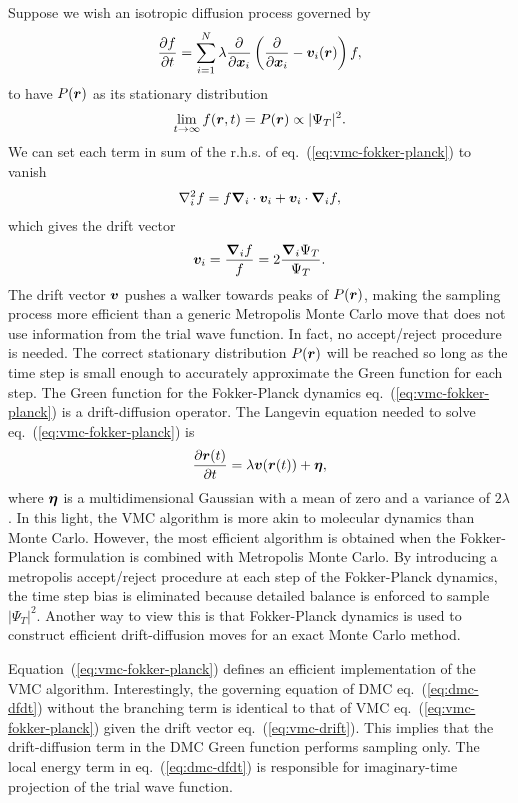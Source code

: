 Suppose we wish an isotropic diffusion process governed by
\begin{align} \label{eq:vmc-fokker-planck}
\dfrac{\partial f}{\partial t} = \sum\limits_{i=1}^N \lambda\dfrac{\partial}{\partial\boldsymbol{x}_i}\left(
\dfrac{\partial}{\partial\boldsymbol{x}_i} -\boldsymbol{v}_i(\boldsymbol{r})
\right)f,
\end{align}
to have $P(\boldsymbol{r})$ as its stationary distribution
\begin{align}
\lim\limits_{t\rightarrow\infty} f(\boldsymbol{r},t) = P(\boldsymbol{r}) \propto \vert\Psi_T\vert^2.
\end{align}
We can set each term in sum of the r.h.s. of eq.~(\ref{eq:vmc-fokker-planck}) to vanish
\begin{align}
\nabla_i^2 f = f\boldsymbol{\nabla}_i\cdot\boldsymbol{v}_i + \boldsymbol{v}_i\cdot\boldsymbol{\nabla}_if,
\end{align}
which gives the drift vector
\begin{align} \label{eq:vmc-drift}
\boldsymbol{v}_i = \dfrac{\boldsymbol{\nabla}_if}{f} = 2\dfrac{\boldsymbol{\nabla}_i\Psi_T}{\Psi_T}.
\end{align}
The drift vector $\boldsymbol{v}$ pushes a walker towards peaks of $P(\boldsymbol{r})$, making the sampling process more efficient than a generic Metropolis Monte Carlo move that does not use information from the trial wave function.
In fact, no accept/reject procedure is needed.
The correct stationary distribution $P(\boldsymbol{r})$ will be reached so long as the time step is small enough to accurately approximate the Green function for each step.
The Green function for the Fokker-Planck dynamics eq.~(\ref{eq:vmc-fokker-planck}) is a drift-diffusion operator. The Langevin equation needed to solve eq.~(\ref{eq:vmc-fokker-planck}) is
\begin{align}
\dfrac{\partial\boldsymbol{r}(t)}{\partial t} = \lambda \boldsymbol{v}(\boldsymbol{r}(t)) + \boldsymbol{\eta},
\end{align}
where $\boldsymbol{\eta}$ is a multidimensional Gaussian with a mean of zero and a variance of $2\lambda$. In this light, the VMC algorithm is more akin to molecular dynamics than Monte Carlo. However, the most efficient algorithm is obtained when the Fokker-Planck formulation is combined with Metropolis Monte Carlo. By introducing a metropolis accept/reject procedure at each step of the Fokker-Planck dynamics, the time step bias is eliminated because detailed balance is enforced to sample $\vert\Psi_T\vert^2$. Another way to view this is that Fokker-Planck dynamics is used to construct efficient drift-diffusion moves for an exact Monte Carlo method.

Equation~(\ref{eq:vmc-fokker-planck}) defines an efficient implementation of the VMC algorithm. Interestingly, the governing equation of DMC eq.~(\ref{eq:dmc-dfdt}) without the branching term is identical to that of VMC eq.~(\ref{eq:vmc-fokker-planck}) given the drift vector eq.~(\ref{eq:vmc-drift}).
This implies that the drift-diffusion term in the DMC Green function performs sampling only. The local energy term in eq.~(\ref{eq:dmc-dfdt}) is responsible for imaginary-time projection of the trial wave function.

